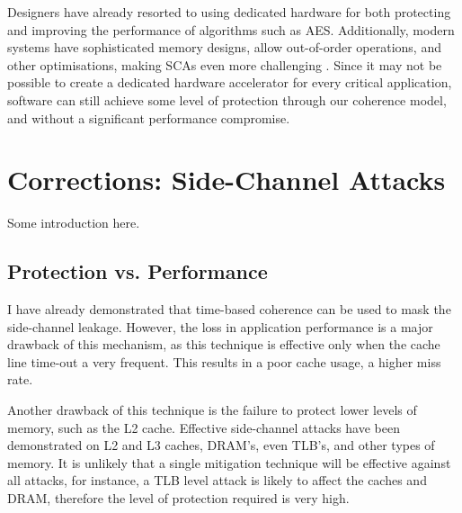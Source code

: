 	Designers have already resorted to using dedicated hardware for both protecting and improving the performance of algorithms such as AES. Additionally, modern systems have sophisticated memory designs, allow out-of-order operations, and other optimisations, making SCAs even more challenging \cite{Tromer10,Mowery12}. Since it may not be possible to create a dedicated hardware accelerator for every critical application, software can still achieve some level of protection through our coherence model, and without a significant performance compromise.




	

\chapter{Corrections: Side-Channel Attacks}
\label{chapter_sca_2}

	Some introduction here.

\section{Protection vs. Performance}
	I have already demonstrated that time-based coherence can be used to mask the side-channel leakage. However, the loss in application performance is a major drawback of this mechanism, as this technique is effective only when the cache line time-out a very frequent. This results in a poor cache usage, a higher miss rate.
	
	Another drawback of this technique is the failure to protect lower levels of memory, such as the L2 cache. Effective side-channel attacks have been demonstrated on L2 and L3 caches, DRAM's, even TLB's, and other types of memory. It is unlikely that a single mitigation technique will be effective against all attacks, for instance, a TLB level attack is likely to affect the caches and DRAM, therefore the level of protection required is very high.
	
